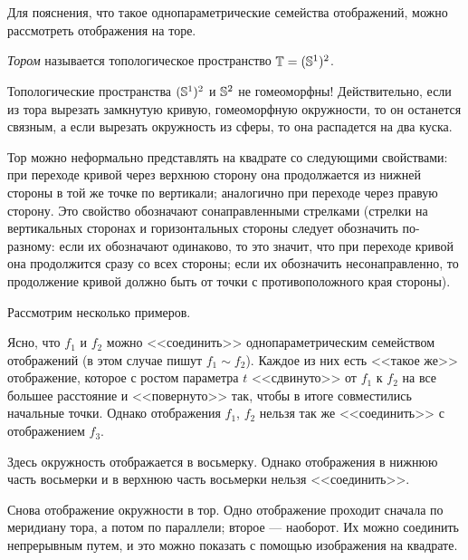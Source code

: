 \documentclass[main]{subfiles}
\begin{document}
\resetcounters

\section{}

Для пояснения, что такое однопараметрические семейства отображений, можно рассмотреть отображения на торе.

\begin{definition}
	\emph{Тором} называется топологическое пространство $ \T = (\S^1)^2 $.
\end{definition}

\begin{remark}
	Топологические пространства $ (\S^1)^2 $ и $ \S^2 $ не гомеоморфны! Действительно, если из тора вырезать замкнутую
	кривую, гомеоморфную окружности, то он останется связным, а если вырезать окружность из сферы, то она распадется
	на два куска.
\end{remark}

Тор можно неформально представлять на квадрате со следующими свойствами: при переходе кривой через верхнюю сторону она
продолжается из нижней стороны в той же точке по вертикали; аналогично при переходе через правую сторону. Это свойство
обозначают сонаправленными стрелками (стрелки на вертикальных сторонах и горизонтальных стороны следует обозначить
по-разному: если их обозначают одинаково, то это значит, что при переходе кривой она продолжится сразу со всех стороны;
если их обозначить несонаправленно, то продолжение кривой должно быть от точки с противоположного края стороны).

Рассмотрим несколько примеров.

Ясно, что $ f_1 $ и $ f_2 $ можно <<соединить>> однопараметрическим семейством отображений (в этом случае пишут
$ f_1 \sim f_2 $). Каждое из них есть <<такое же>> отображение, которое с ростом параметра $ t $ <<сдвинуто>> от
$ f_1 $ к $ f_2 $ на все большее расстояние и <<повернуто>> так, чтобы в итоге совместились начальные точки.
Однако отображения $ f_1 $, $ f_2 $ нельзя так же <<соединить>> с отображением $ f_3 $.

Здесь окружность отображается в восьмерку. Однако отображения в нижнюю часть восьмерки и в верхнюю часть восьмерки
нельзя <<соединить>>.

Снова отображение окружности в тор. Одно отображение проходит сначала по меридиану тора, а потом по параллели; второе
--- наоборот. Их можно соединить непрерывным путем, и это можно показать с помощью изображения на квадрате.
\end{document}
